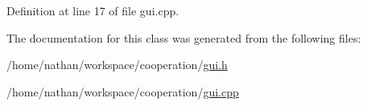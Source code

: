 Definition at line 17 of file gui.cpp.



The documentation for this class was generated from the following files:\begin{DoxyCompactItemize}
\item 
/home/nathan/workspace/cooperation/\hyperlink{gui_8h}{gui.h}\item 
/home/nathan/workspace/cooperation/\hyperlink{gui_8cpp}{gui.cpp}\end{DoxyCompactItemize}
